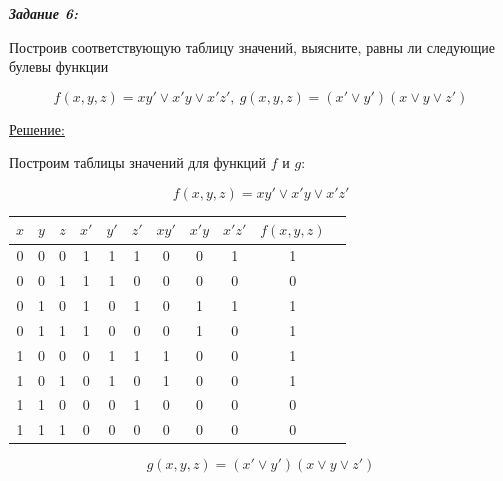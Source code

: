 \documentclass[11pt]{article}
\begin{document}
\pagebreak

\textit{\textbf{Задание 6:}}

Построив соответствующую таблицу значений, выясните, равны ли
следующие булевы функции

$$f(x,y,z)=xy' \lor x'y \lor x'z',
\ g(x,y,z)=(x' \lor y')(x \lor y \lor z')$$

\underline{Решение:}

Построим таблицы значений для функций $f$ и $g$:

$$f(x,y,z)=x y' \lor x' y \lor x'z'$$

\begin{center}
        \begin{tabular}{ |c|c|c|c|c|c|c|c|c|c|c| }
                \hline
                $x$ & $y$ & $z$ & $x'$ & $y'$ & $z'$ & $xy'$ & $x'y$ & $x' z'$ & $f(x,y,z)$\\
                \hline
                0 & 0 & 0 & 1 & 1 & 1 & 0 & 0 & 1 & 1\\
                \hline
                0 & 0 & 1 & 1 & 1 & 0 & 0 & 0 & 0 & 0\\
                \hline
                0 & 1 & 0 & 1 & 0 & 1 & 0 & 1 & 1 & 1\\
                \hline
                0 & 1 & 1 & 1 & 0 & 0 & 0 & 1 & 0 & 1\\
                \hline
                1 & 0 & 0 & 0 & 1 & 1 & 1 & 0 & 0 & 1\\
                \hline
                1 & 0 & 1 & 0 & 1 & 0 & 1 & 0 & 0 & 1\\
                \hline
                1 & 1 & 0 & 0 & 0 & 1 & 0 & 0 & 0 & 0\\
                \hline
                1 & 1 & 1 & 0 & 0 & 0 & 0 & 0 & 0 & 0\\
                \hline
        \end{tabular}
\end{center}

$$g(x,y,z)=(x' \lor y')(x \lor y \lor z')$$
\end{document}
